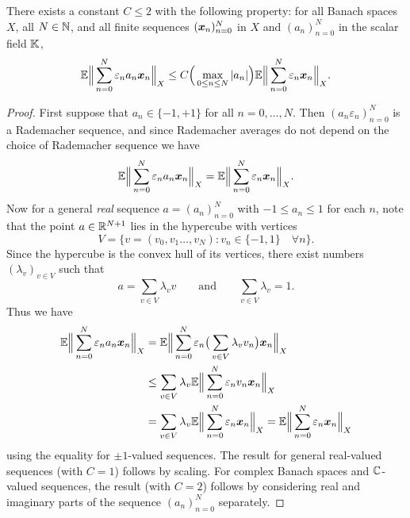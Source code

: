 \begin{thm}\label{thm:contraction}
  There exists a constant $C \leq 2$ with the following property: for all Banach spaces $X$, all $N \in \mathbb{N}$, and all finite sequences $(\bm{x}_{n})_{n = 0}^{N}$ in $X$ and $(a_{n})_{n=0}^{N}$ in the scalar field $\mathbb{K}$,
  \begin{equation*}
    \mathbb{E} \Big\| \sum_{n = 0}^{N} \varepsilon_{n} a_{n} \bm{x}_{n} \Big\|_{X} \leq C \Big( \max_{0 \leq n \leq N} |a_{n}| \Big) \mathbb{E} \Big\| \sum_{n = 0}^{N} \varepsilon_{n} \bm{x}_{n} \Big\|_{X}.
  \end{equation*}
\end{thm}

\begin{proof}
  First suppose that $a_n \in \{-1,+1\}$ for all $n = 0, \ldots, N$.
  Then $(a_n \varepsilon_{n})_{n=0}^{N}$ is a Rademacher sequence, and since Rademacher averages do not depend on the choice of Rademacher sequence we have
  \begin{equation*}
    \mathbb{E} \Big\| \sum_{n = 0}^{N} \varepsilon_{n} a_{n} \bm{x}_{n} \Big\|_{X} = \mathbb{E} \Big\| \sum_{n = 0}^{N} \varepsilon_{n} \bm{x}_{n} \Big\|_{X}.
  \end{equation*}
  Now for a general \emph{real} sequence $a = (a_n)_{n=0}^{N}$ with $-1 \leq a_n \leq 1$ for each $n$, note that the point $a \in \mathbb{R}^{N+1}$ lies in the hypercube with vertices
  \begin{equation*}
    V = \{v = (v_{0}, v_{1}\ldots, v_{N}) : v_{n} \in \{-1,1\} \quad \forall n \}.
  \end{equation*}
  Since the hypercube is the convex hull of its vertices, there exist numbers $(\lambda_{v})_{v \in V}$ such that
  \begin{equation*}
    a = \sum_{v \in V} \lambda_{v} v \qquad \text{and} \qquad \sum_{v \in V} \lambda_{v} = 1.
  \end{equation*}
  Thus we have
  \begin{equation*}
    \begin{aligned}
    \mathbb{E} \Big\| \sum_{n = 0}^{N} \varepsilon_{n} a_{n} \bm{x}_{n} \Big\|_{X}
    &= \mathbb{E} \Big\| \sum_{n = 0}^{N} \varepsilon_{n} \big( \sum_{v \in V} \lambda_{v} v_{n} \big) \bm{x}_{n} \Big\|_{X} \\
    &\leq \sum_{v \in V} \lambda_{v} \mathbb{E} \Big\| \sum_{n = 0}^{N} \varepsilon_{n} v_{n} \bm{x}_{n} \Big\|_{X} \\
    &= \sum_{v \in V} \lambda_{v} \mathbb{E} \Big\| \sum_{n = 0}^{N} \varepsilon_{n} \bm{x}_{n} \Big\|_{X} 
    = \mathbb{E} \Big\| \sum_{n = 0}^{N} \varepsilon_{n} \bm{x}_{n} \Big\|_{X}
  \end{aligned}
\end{equation*}
using the equality for $\pm 1$-valued sequences.
The result for general real-valued sequences (with $C=1$) follows by scaling.
For complex Banach spaces and $\mathbb{C}$-valued sequences, the result (with $C=2$) follows by considering real and imaginary parts of the sequence $(a_n)_{n = 0}^{N}$ separately. 
\end{proof}

